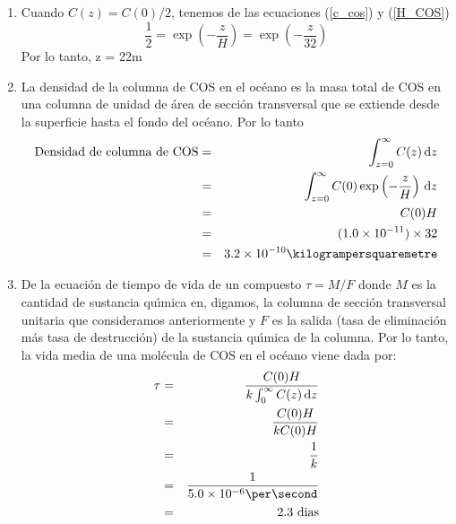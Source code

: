 \begin{example}
\begin{enumerate}
\item Cuando $C(z)=C(0)/2$, tenemos de las ecuaciones (\ref{c_cos}) y  (\ref{H_COS}) 
\begin{equation*}
\frac{1}{2}=\exp\left(-\frac{z}{H} \right)=\exp\left( -\frac{z}{32}\right)
\end{equation*}
Por lo tanto, z = 22m
\item La densidad de la columna de COS en el océano es la masa total de COS en una columna de unidad de área de sección transversal que se extiende desde la superficie hasta el fondo del océano. Por lo tanto
\begin{eqnarray*}
\textrm{Densidad de columna de COS} &=& \int_{z=0}^\infty C(z)\,\mathrm{d}z \\
       &=&  \int_{z=0}^\infty C(0)\exp\left(-\frac{z}{H}\right)\,\mathrm{d}z  \\
       &=& C(0)H \\
       &=& (1.0\times10^{-11})\times 32 \\
       &=& 3.2\times10^{-10}\kilogrampersquaremetre 
\end{eqnarray*}
%
\item De la ecuación de tiempo de vida de un compuesto $\tau=M/F$
donde $M$ es la cantidad de sustancia qu\'{\i}mica en, digamos, la columna de sección transversal unitaria que consideramos anteriormente y $F$ es la salida (tasa de eliminación más tasa de destrucción) de la sustancia qu\'{\i}mica de la columna. Por lo tanto, la vida media de una molécula de COS en el océano viene dada por:
\begin{eqnarray*}
\tau & = & \frac{C(0)H}{k\int_0^\infty C(z)\,\mathrm{d}z } \\
& =& \frac{C(0)H}{kC(0)H}  \\ 
& =& \frac{1}{k}  \\ 
&=& \frac{1}{5.0\times10^{-6} \per\second}\\
&=& 2.3  \textrm{ dias} 
\end{eqnarray*}
\end{enumerate}
\end{example}
